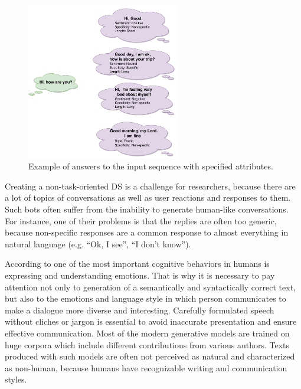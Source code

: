 \begin{figure}
  \centering
  \includegraphics[width=0.6\textwidth]{figures/dialogue_example.pdf}
  \caption{Example of answers to the input sequence with specified attributes.}
  \label{dialogue_example}
\end{figure}

Creating a non-task-oriented DS is a challenge for researchers, because there are a lot of topics of conversations as well as user reactions and responses to them. Such bots often suffer from the inability to generate human-like conversations. For instance, one of their problems is that the replies are often too generic, because non-specific responses are a common response to almost everything in natural language (e.g. ``Ok, I see'', ``I don't know''). 

According to \cite{salovey1990emotional} one of the most important cognitive behaviors in humans is expressing and understanding emotions. That is why it is necessary to pay attention not only to generation of a semantically and syntactically correct text, but also to the emotions and language style in which person communicates to make a dialogue more diverse and interesting. Carefully formulated speech without cliches or jargon is essential to avoid inaccurate presentation and ensure effective communication. Most of the modern generative models are trained on huge corpora which include different contributions from various authors. Texts produced with such models are often not perceived as natural and characterized as non-human, because humans have recognizable writing and communication styles.

